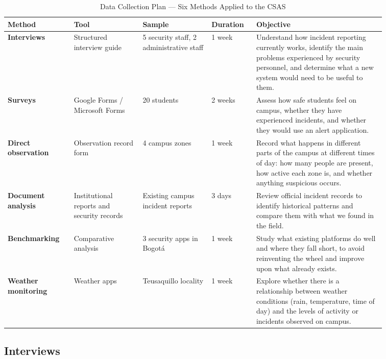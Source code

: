 \documentclass[12pt, onecolumn]{IEEEtran}
\begin{document}
\begin{table}[h]
\centering
\caption{Data Collection Plan --- Six Methods Applied to the CSAS}
\label{tab:plan}
\renewcommand{\arraystretch}{1.3}
\begin{tabular}{>{\bfseries\small}p{0.14\linewidth}
                >{\small}p{0.16\linewidth}
                >{\small}p{0.16\linewidth}
                >{\small}p{0.10\linewidth}
                >{\small}p{0.30\linewidth}}
\toprule
\textbf{Method} & \textbf{Tool} & \textbf{Sample} &
\textbf{Duration} & \textbf{Objective} \\
\midrule
Interviews
  & Structured interview guide
  & 5 security staff, 2 administrative staff
  & 1 week
  & Understand how incident reporting currently works, identify
    the main problems experienced by security personnel, and
    determine what a new system would need to be useful to them. \\
\rowcolor{rowgray}
Surveys
  & Google Forms / Microsoft Forms
  & 20 students
  & 2 weeks
  & Assess how safe students feel on campus, whether they have
    experienced incidents, and whether they would use an alert
    application. \\
Direct observation
  & Observation record form
  & 4 campus zones
  & 1 week
  & Record what happens in different parts of the campus at
    different times of day: how many people are present, how
    active each zone is, and whether anything suspicious occurs. \\
\rowcolor{rowgray}
Document analysis
  & Institutional reports and security records
  & Existing campus incident reports
  & 3 days
  & Review official incident records to identify historical
    patterns and compare them with what we found in the field. \\
Benchmarking
  & Comparative analysis
  & 3 security apps in Bogot\'{a}
  & 1 week
  & Study what existing platforms do well and where they fall
    short, to avoid reinventing the wheel and improve upon
    what already exists. \\
\rowcolor{rowgray}
Weather monitoring
  & Weather apps
  & Teusaquillo locality
  & 1 week
  & Explore whether there is a relationship between weather
    conditions (rain, temperature, time of day) and the levels
    of activity or incidents observed on campus. \\
\bottomrule
\end{tabular}
\end{table}

\subsection{Interviews}
\end{document}
